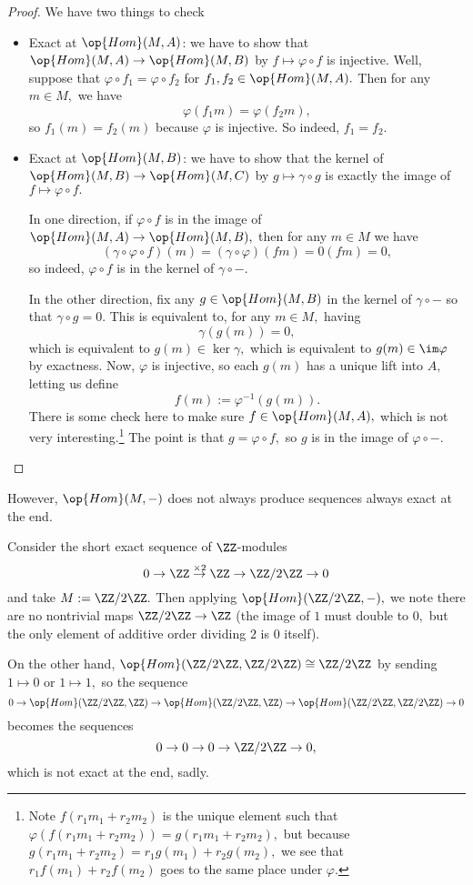 \begin{proof}
	We have two things to check
	\begin{itemize}
		\item Exact at $\op{Hom}(M,A)$: we have to show that $\op{Hom}(M,A)\to\op{Hom}(M,B)$ by $f\mapsto\varphi\circ f$ is injective. Well, suppose that $\varphi\circ f_1=\varphi\circ f_2$ for $f_1,f_2\in\op{Hom}(M,A).$ Then for any $m\in M,$ we have
		\[\varphi(f_1m)=\varphi(f_2m),\]
		so $f_1(m)=f_2(m)$ because $\varphi$ is injective. So indeed, $f_1=f_2.$
		\item Exact at $\op{Hom}(M,B)$: we have to show that the kernel of $\op{Hom}(M,B)\to\op{Hom}(M,C)$ by $g\mapsto\gamma\circ g$ is exactly the image of $f\mapsto\varphi\circ f.$

		In one direction, if $\varphi\circ f$ is in the image of $\op{Hom}(M,A)\to\op{Hom}(M,B),$ then for any $m\in M$ we have
		\[(\gamma\circ\varphi\circ f)(m)=(\gamma\circ\varphi)(fm)=0(fm)=0,\]
		so indeed, $\varphi\circ f$ is in the kernel of $\gamma\circ-.$

		In the other direction, fix any $g\in\op{Hom}(M,B)$ in the kernel of $\gamma\circ-$ so that $\gamma\circ g=0.$ This is equivalent to, for any $m\in M,$ having
		\[\gamma(g(m))=0,\]
		which is equivalent to $g(m)\in\ker\gamma,$ which is equivalent to $g(m)\in\im\varphi$ by exactness. Now, $\varphi$ is injective, so each $g(m)$ has a unique lift into $A,$ letting us define
		\[f(m):=\varphi^{-1}(g(m)).\]
		There is some check here to make sure $f\in\op{Hom}(M,A),$ which is not very interesting.\footnote{Note $f(r_1m_1+r_2m_2)$ is the unique element such that $\varphi(f(r_1m_1+r_2m_2))=g(r_1m_1+r_2m_2),$ but because $g(r_1m_1+r_2m_2)=r_1g(m_1)+r_2g(m_2),$ we see that $r_1f(m_1)+r_2f(m_2)$ goes to the same place under $\varphi.$} The point is that $g=\varphi\circ f,$ so $g$ is in the image of $\varphi\circ-.$
		\qedhere
	\end{itemize}
\end{proof}
However, $\op{Hom}(M,-)$ does not always produce sequences always exact at the end.
\begin{example}
	Consider the short exact sequence of $\ZZ$-modules
	\[0\to\ZZ\stackrel{\times2}\to\ZZ\to\ZZ/2\ZZ\to0\]
	and take $M:=\ZZ/2\ZZ.$ Then applying $\op{Hom}(\ZZ/2\ZZ,-),$ we note there are no nontrivial maps $\ZZ/2\ZZ\to\ZZ$ (the image of $1$ must double to $0,$ but the only element of additive order dividing $2$ is $0$ itself).
	
	On the other hand, $\op{Hom}(\ZZ/2\ZZ,\ZZ/2\ZZ)\cong\ZZ/2\ZZ$ by sending $1\mapsto0$ or $1\mapsto1,$ so the sequence
	\[0\to\op{Hom}(\ZZ/2\ZZ,\ZZ)\to\op{Hom}(\ZZ/2\ZZ,\ZZ)\to\op{Hom}(\ZZ/2\ZZ,\ZZ/2\ZZ)\to0\]
	becomes the sequences
	\[0\to0\to0\to\ZZ/2\ZZ\to0,\]
	which is not exact at the end, sadly.
\end{example}

